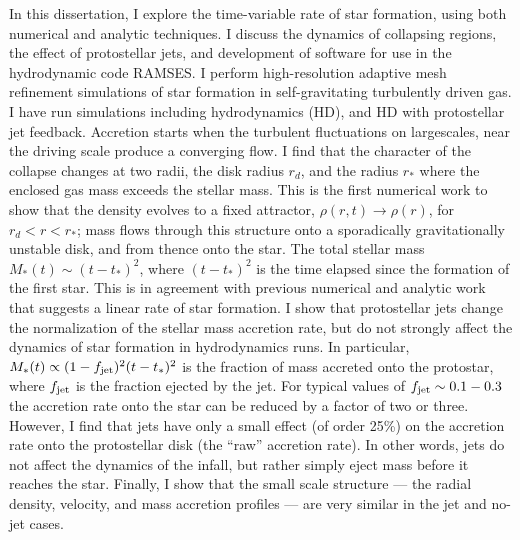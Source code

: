 \documentclass[12pt,notitlepage]{report}
\begin{document}
In this dissertation, I explore the time-variable rate of star formation, using both numerical and analytic techniques. 
I discuss the dynamics of collapsing regions, the effect of protostellar jets, and development of software for use in the hydrodynamic code RAMSES.
I perform high-resolution adaptive mesh refinement simulations of star formation in self-gravitating turbulently driven gas. 
I have run simulations including hydrodynamics (HD), and HD with protostellar jet feedback.
Accretion starts when the turbulent fluctuations on largescales, near the driving scale produce a converging flow.
I find that the character of the collapse changes at two radii, the disk radius $r_d$, and the radius $r_*$ where the enclosed gas mass exceeds the stellar mass. 
This is the first numerical work to show that the density evolves to a fixed attractor, $\rho(r,t ) \rightarrow \rho(r)$, for $r_d<r<r_*$; mass flows through this structure onto a sporadically gravitationally unstable disk, and from thence onto the star. 
The total stellar mass $M_*(t)\sim (t-t_*)^2$, where $(t-t_*)^2$ is the time elapsed since the formation of the first star. 
This is in agreement with previous numerical and analytic work that suggests a linear rate of star formation.
I show that protostellar jets change the normalization of the stellar mass accretion rate, 
but do not strongly affect the dynamics of star formation in hydrodynamics runs. 
In particular, $M_*(t) \propto (1 - f_{\rm jet})^2 (t-t_*)^2$ is the fraction of mass accreted onto the protostar, 
where $f_{\rm jet}$ is the fraction ejected by the jet. 
For typical values of $f_{\rm jet} \sim 0.1 - 0.3$ the accretion rate onto the star can be reduced by a factor of two or three. 
However, I find that jets have only a small effect (of order 25\%) on the accretion rate onto the protostellar disk (the ``raw'' accretion rate). 
In other words, jets do not affect the dynamics of the infall, but rather simply eject mass before it reaches the star.
Finally, I show that the small scale structure --- the radial density, velocity, and mass accretion profiles --- are very similar in the jet and no-jet cases.

\endabstract 
\newpage

\ifcopyright\copyrightpage\fi
\ifhavededication\dedicationpage\fi
\newpage
\renewcommand\contentsname{\begin{center}  \vspace{-2.5cm}{\Large TABLE \ OF \ CONTENTS}\vspace{-1.5cm} \end{center}}
\renewcommand\listfigurename{\vspace{-2.5cm}{\begin{center}{\Large LIST \ OF \ FIGURES} \end{center}} \vspace{-0.5cm}}
\renewcommand\listtablename{\begin{center} \vspace{-2.5cm}{\Large LIST \ OF \ TABLES}\vspace{-0.5cm} \end{center}}
\end{document}
